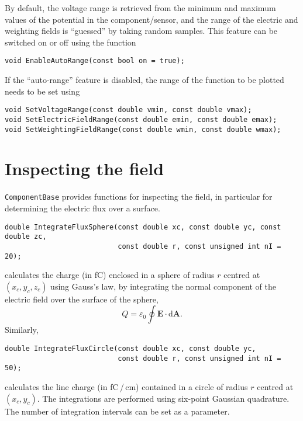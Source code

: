 By default, the voltage range is retrieved from the 
minimum and maximum values of the 
potential in the component/sensor, and
the range of the electric and weighting fields is
``guessed'' by taking random samples.
This feature can be switched on or off using the function
\begin{lstlisting}
void EnableAutoRange(const bool on = true);
\end{lstlisting}

If the ``auto-range'' feature is disabled,
the range of the function to be plotted needs to be set using
\begin{lstlisting}
void SetVoltageRange(const double vmin, const double vmax);
void SetElectricFieldRange(const double emin, const double emax);
void SetWeightingFieldRange(const double wmin, const double wmax);
\end{lstlisting}

\section{Inspecting the field}
\texttt{ComponentBase} provides functions for inspecting the field, 
in particular for determining the electric flux over a surface.
\begin{lstlisting}
double IntegrateFluxSphere(const double xc, const double yc, const double zc,
                           const double r, const unsigned int nI = 20);
\end{lstlisting}
calculates the charge (in fC) enclosed in a sphere of radius $r$ centred at 
$\left(x_{c}, y_{c}, z_{c}\right)$ using Gauss's law, \ie by 
integrating the normal component of the electric field over the 
surface of the sphere, 
\begin{equation*}
  Q = \varepsilon_{0} \oint \mathbf{E}\cdot \text{d}\mathbf{A}.
\end{equation*}  
Similarly,
\begin{lstlisting}
double IntegrateFluxCircle(const double xc, const double yc, 
                           const double r, const unsigned int nI = 50);
\end{lstlisting}
calculates the line charge (in fC\,/\,cm) contained in a circle of radius $r$ 
centred at $\left(x_{c}, y_{c}\right)$.  
The integrations are performed using six-point Gaussian quadrature. 
The number of integration intervals can be set as a parameter. 

